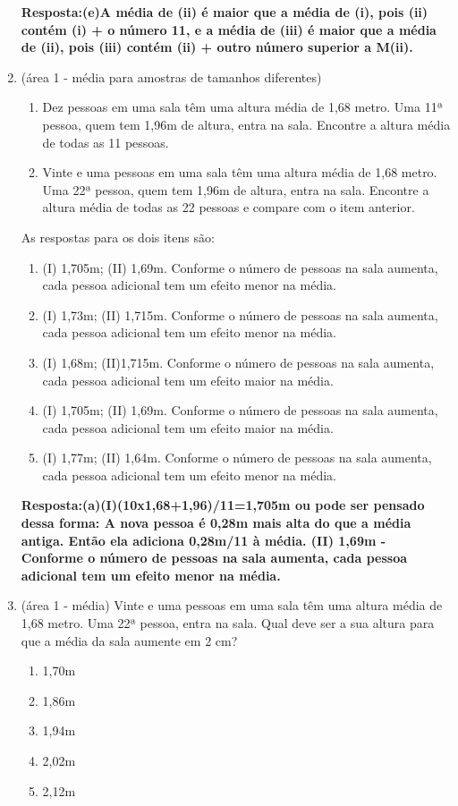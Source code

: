 \documentclass[12pt]{article}\documentclass[brazilian,12pt,a4paper,final]{article}
\begin{document}
\begin{enumerate}
\textbf{Resposta:(e)A média de (ii) é maior que a média de (i), pois (ii) contém (i) + o número 11, e a média de (iii) é maior que a média de (ii), pois (iii) contém (ii) + outro número superior a M(ii).} 

\item (área 1 - média para amostras de tamanhos diferentes) \begin{enumerate}[label=(\Roman*)] 
\item Dez pessoas em uma sala têm uma altura média de 1,68 metro. Uma 11ª pessoa,
quem tem 1,96m de altura, entra na sala. Encontre a altura média de todas as 11 pessoas.
\item Vinte e uma pessoas em uma sala têm uma altura média de 1,68 metro. Uma 22ª pessoa,
quem tem 1,96m de altura, entra na sala. Encontre a altura média de todas as 22 pessoas e compare com o item anterior.
\end{enumerate}
As respostas para os dois itens são:
\begin{enumerate}
    \item (I) 1,705m; (II) 1,69m. Conforme o número de pessoas na sala aumenta, cada pessoa adicional tem um efeito menor na média.
    \item (I) 1,73m; (II) 1,715m. Conforme o número de pessoas na sala aumenta, cada pessoa adicional tem um efeito menor na média.
    \item (I) 1,68m; (II)1,715m. Conforme o número de pessoas na sala aumenta, cada pessoa adicional tem um efeito maior na média.
    \item (I) 1,705m; (II) 1,69m. Conforme o número de pessoas na sala aumenta, cada pessoa adicional tem um efeito maior na média.
    \item (I) 1,77m; (II) 1,64m. Conforme o número de pessoas na sala aumenta, cada pessoa adicional tem um efeito menor na média.
\end{enumerate}
\textbf{Resposta:(a)(I)(10x1,68+1,96)/11=1,705m ou pode ser pensado dessa forma: A nova pessoa é 0,28m mais alta do que a média antiga. Então ela adiciona 0,28m/11 à média.
 (II) 1,69m - Conforme o número de pessoas na sala aumenta, cada pessoa adicional tem um efeito menor na média.}
 

\item (área 1 - média) Vinte e uma pessoas em uma sala têm uma altura média de 1,68 metro. Uma 22ª pessoa, entra na sala. Qual deve ser a sua altura para que a média da sala aumente em 2 cm?
\begin{enumerate}[label=(\alph*)]
    \item 1,70m
    \item 1,86m
    \item 1,94m
    \item 2,02m
    \item 2,12m
\end{enumerate}


\end{enumerate}
\end{document}

